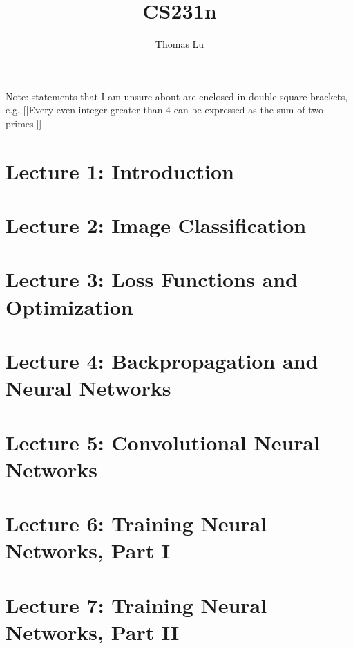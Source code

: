 \documentclass{article}
\title{CS231n}
\author{Thomas Lu}
\date{}
\begin{document}
\maketitle
Note: statements that I am unsure about are enclosed in double square brackets, e.g. [[Every even integer greater than 4 can be expressed as the sum of two primes.]]
\section{Lecture 1: Introduction}

\section{Lecture 2: Image Classification}

\section{Lecture 3: Loss Functions and Optimization}

\section{Lecture 4: Backpropagation and Neural Networks}

\section{Lecture 5: Convolutional Neural Networks}

\section{Lecture 6: Training Neural Networks, Part I}

\section{Lecture 7: Training Neural Networks, Part II}

\end{document}
